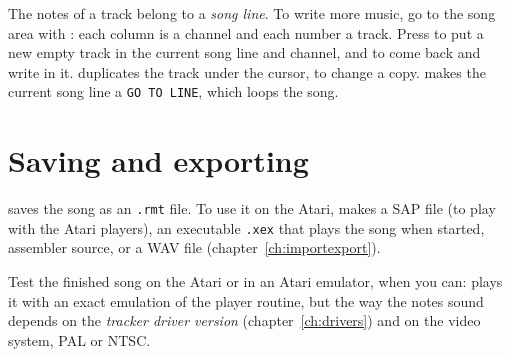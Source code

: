 The notes of a track belong to a \emph{song line}. To write more music, go to the song area with : each column is a
channel and each number a track. Press  to put a new empty track in the current song line and channel, and
 to come back and write in it.  duplicates the track under the cursor, to change a copy.
 makes the current song line a \texttt{GO TO LINE}, which loops the song.

\section{Saving and exporting}

 saves the song as an \texttt{.rmt} file. To use it on the Atari,  makes a SAP
file (to play with the Atari players), an executable \texttt{.xex} that plays the song when started, assembler source, or a WAV file
(chapter~\ref{ch:importexport}).

\begin{note}
Test the finished song on the Atari or in an Atari emulator, when you can: \RITMO{} plays it with an exact emulation
of the player routine, but the way the notes sound depends on the \emph{tracker driver version} (chapter~\ref{ch:drivers}) and on the video
system, PAL or NTSC.
\end{note}
